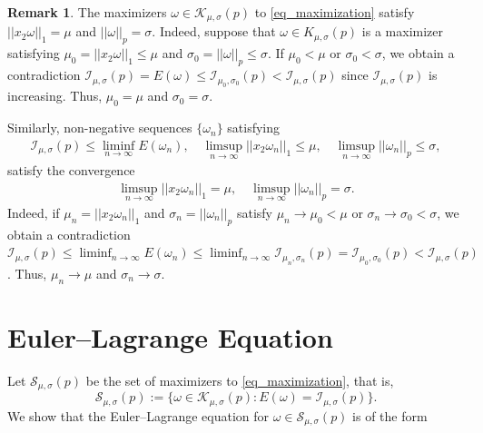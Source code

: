 \documentclass[11pt]{amsart}
\theoremstyle{definition}
\theoremstyle{definition}
\newtheorem{remark}[theorem]{Remark}
\numberwithin{equation}{section}
\newcommand{\0}{\emptyset}
\newcommand{\calI}{\mathcal I}
\newcommand{\calK}{\mathcal K}
\newcommand{\calS}{\mathcal S}
\begin{document}
	\begin{remark}\label{r: maxmusigma}
		The maximizers $\omega\in \calK_{\mu,\sigma}(p)$ to \eqref{eq_maximization} satisfy $||x_2\omega||_{1}=\mu$ and $||\omega||_{p}=\sigma$. Indeed, suppose that $\omega\in K_{\mu,\sigma}(p)$ is a maximizer satisfying $\mu_0=||x_2\omega||_{1}\leq \mu$ and $\sigma_0=||\omega||_{p}\leq\sigma$.
		If $\mu_0<\mu$ or $\sigma_{0}<\sigma$, we obtain a contradiction $\calI_{\mu,\sigma}(p)=E(\omega)\leq \calI_{\mu_0,\sigma_0}(p)<\calI_{\mu,\sigma}(p)$ since $\calI_{\mu,\sigma}(p)$ is increasing. Thus, $\mu_0=\mu$ and $\sigma_0=\sigma$.
		
		Similarly, non-negative sequences $\{\omega_n\}$ satisfying
		\begin{align*}
			\calI_{\mu,\sigma}(p)\leq \liminf_{n\to\infty}E(\omega_n),\quad \limsup_{n\to\infty}||x_2\omega_n||_{1}\leq \mu,\quad \limsup_{n\to\infty}||\omega_n||_{p}\leq \sigma,
		\end{align*}
		satisfy the convergence 
		\begin{align*}
			\limsup_{n\to\infty}||x_2\omega_n||_{1}= \mu,\quad \limsup_{n\to\infty}||\omega_n||_{p}= \sigma.
		\end{align*}
		Indeed, if $\mu_n=||x_2\omega_n||_{1}$ and $\sigma_n=||\omega_n||_{p}$ satisfy $\mu_n\to \mu_0< \mu$ or $\sigma_n\to \sigma_0< \sigma$, we obtain a contradiction $\calI_{\mu,\sigma}(p)\leq \liminf_{n\to\infty}E(\omega_n)\leq \liminf_{n\to\infty} \calI_{\mu_n,\sigma_n}(p)=\calI_{\mu_0,\sigma_0}(p)<\calI_{\mu,\sigma}(p)$. Thus, $\mu_n\to \mu$ and $\sigma_n\to \sigma$. 
	\end{remark}
	
	
	
	
	\section{Euler--Lagrange Equation}\label{sec:EL}
	
	
	Let $\calS_{\mu,\sigma}(p)$ be the set of maximizers to \eqref{eq_maximization}, that is,
	\[
	\calS_{\mu, \sigma}(p) := \{ \omega \in \calK_{\mu, \sigma}(p): E(\omega) = \calI_{\mu, \sigma}(p) \}.
	\]
	We show that the Euler--Lagrange equation for $\omega\in \calS_{\mu,\sigma}(p)$ is of the form 
	
\end{document}
